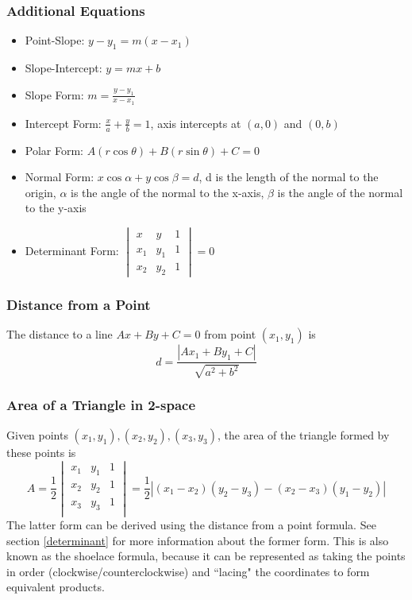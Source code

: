 \documentclass{article}
\begin{document}
\subsubsection{Additional Equations}
\begin{itemize}
    \item Point-Slope: $y-y_1 = m(x-x_1)$
    \item Slope-Intercept: $y=mx+b$
    \item Slope Form: $m=\frac{y-y_1}{x-x_1}$
    \item Intercept Form: $\frac{x}{a} + \frac{y}{b} = 1$, axis intercepts at $(a, 0)$ and $(0, b)$
    \item Polar Form: $A\left(r\cos{\theta}\right)+B\left(r\sin{\theta}\right) + C = 0$
    \item Normal Form: $x\cos{\alpha} + y\cos{\beta} = d$, d is the length of the normal to the origin, $\alpha$ is the angle of the normal to the x-axis, $\beta$ is the angle of the normal to the y-axis
    \item Determinant Form: $\begin{vmatrix}
x & y & 1\\
x_1 & y_1 & 1 \\
x_2 & y_2 & 1
\end{vmatrix}= 0$
\end{itemize}

\subsubsection{Distance from a Point}
The distance to a line $Ax+By+C=0$ from point $(x_1, y_1)$ is
$$d=\frac{\left|Ax_1 + By_1 + C\right|}{\sqrt{a^2+b^2}}$$

\subsubsection{Area of a Triangle in 2-space}
Given points $(x_1, y_1), (x_2, y_2), (x_3, y_3)$, the area of the triangle formed by these points is
$$A = \frac{1}{2}\begin{vmatrix}
    x_1 & y_1 & 1 \\
    x_2 & y_2 & 1 \\
    x_3 & y_3 & 1 \\
\end{vmatrix} = \frac{1}{2}\left|(x_1-x_2)(y_2-y_3) - (x_2 - x_3)(y_1 - y_2)\right|$$
The latter form can be derived using the distance from a point formula. See section \ref{determinant} for more information about the former form.
This is also known as the shoelace formula, because it can be represented as taking the points in order (clockwise/counterclockwise) and ``lacing" the coordinates to form equivalent products.
\end{document}
